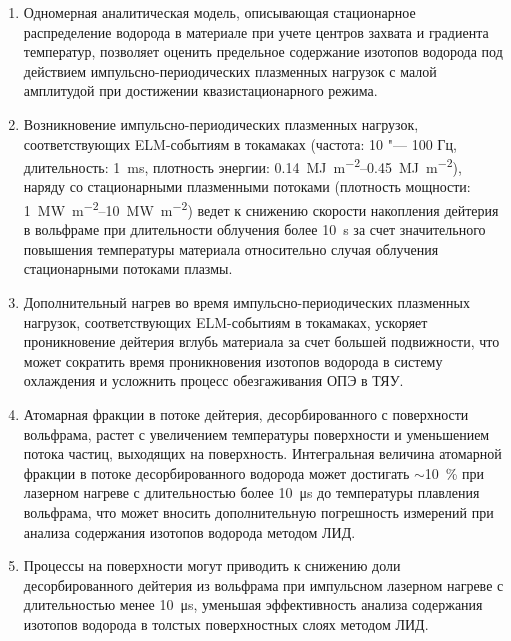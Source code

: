 {}
\begin{enumerate}[beginpenalty=10000] %
    \item Одномерная аналитическая модель, описывающая стационарное распределение водорода в материале при учете центров захвата и градиента температур, позволяет оценить предельное содержание изотопов водорода под действием импульсно-периодических плазменных нагрузок с малой амплитудой при достижении квазистационарного режима.
    \item Возникновение импульсно-периодических плазменных нагрузок, соответствующих ELM-событиям в токамаках (частота: 10 "--- 100 Гц, длительность: \SI{1}{\milli\second}, плотность энергии: \SIrange{0.14}{0.45}{\mega\joule\per\meter\squared}), наряду со стационарными плазменными потоками (плотность мощности: \SIrange{1}{10}{\mega\watt\per\meter\squared}) ведет к снижению скорости накопления дейтерия в вольфраме при длительности облучения более \SI{10}{\second} за счет значительного повышения температуры материала относительно случая облучения стационарными потоками плазмы. 
    \item Дополнительный нагрев во время импульсно-периодических плазменных нагрузок, соответствующих ELM-событиям в токамаках, ускоряет проникновение дейтерия вглубь материала за счет большей подвижности, что может сократить время проникновения изотопов водорода в систему охлаждения и усложнить процесс обезгаживания ОПЭ в ТЯУ. 
    \item Атомарная фракции в потоке дейтерия, десорбированного с поверхности вольфрама, растет с увеличением температуры поверхности и уменьшением потока частиц, выходящих на поверхность. Интегральная величина атомарной фракции в потоке десорбированного водорода может достигать $\sim$10~\% при лазерном нагреве с длительностью более \SI{10}{\micro\second} до температуры плавления вольфрама, что может вносить дополнительную погрешность измерений при анализа содержания изотопов водорода методом ЛИД.
    \item Процессы на поверхности могут приводить к снижению доли десорбированного дейтерия из вольфрама при импульсном лазерном нагреве с длительностью менее \SI{10}{\micro\second}, уменьшая эффективность анализа содержания изотопов водорода в толстых поверхностных слоях методом ЛИД.
\end{enumerate}

